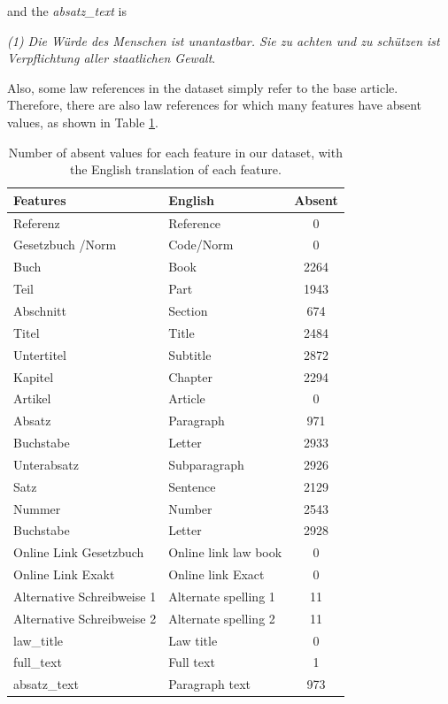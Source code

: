 \documentclass[sigconf]{acmart}
\begin{document}
and the \textit{absatz\_text} is\\

\begin{framed}
{\textit{(1) Die Würde des Menschen ist unantastbar. Sie zu achten und zu schützen ist Verpflichtung aller staatlichen Gewalt}.}
\end{framed}

Also, some law references in the dataset simply refer to the base article. Therefore, there are also law references for which many features have absent values, as shown in Table \ref{tab:dataset-nan}.

\begin{table}[h]
\centering
\caption{Number of absent values for each feature in our dataset, with the English translation of each feature.}
\label{tab:dataset-nan}
\begin{tabular}{|l|l|c|}
\hline
\textbf{Features} & \textbf{English} & \textbf{Absent}\\
\hline
Referenz & Reference & 0 \\ 
Gesetzbuch /Norm & Code/Norm & 0 \\ 
Buch & Book & 2264 \\
Teil & Part & 1943 \\
Abschnitt & Section & 674 \\
Titel & Title & 2484 \\
Untertitel & Subtitle & 2872 \\
Kapitel & Chapter & 2294 \\
Artikel & Article & 0 \\
Absatz & Paragraph & 971 \\
Buchstabe & Letter & 2933 \\
Unterabsatz & Subparagraph & 2926 \\
Satz & Sentence & 2129 \\
Nummer & Number & 2543 \\
Buchstabe & Letter & 2928 \\
Online Link Gesetzbuch & Online link law book & 0 \\
Online Link Exakt & Online link Exact & 0 \\
Alternative Schreibweise 1 & Alternate spelling 1 & 11 \\
Alternative Schreibweise 2 & Alternate spelling 2 & 11 \\
law\_title & Law title & 0 \\
full\_text & Full text & 1 \\
absatz\_text & Paragraph text & 973 \\
\hline
\end{tabular}
\end{table}
\end{document}
